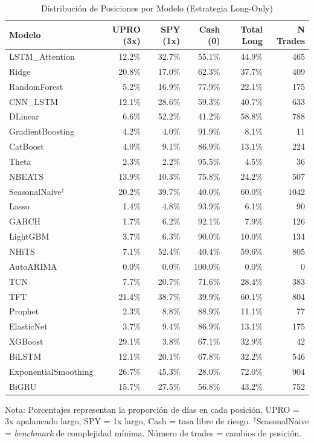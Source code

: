 \begin{table}[H]
\centering
\caption{Distribuci\'on de Posiciones por Modelo (Estrategia Long-Only)}
\label{tab:position_distribution}
\small
\begin{tabular}{@{}lrrrrr@{}}
\toprule
\textbf{Modelo} & \textbf{UPRO (3x)} & \textbf{SPY (1x)} & \textbf{Cash (0)} & \textbf{Total Long} & \textbf{N\textdegree{} Trades} \\
\midrule
LSTM\_Attention & 12.2\% & 32.7\% & 55.1\% & 44.9\% & 465 \\
Ridge & 20.8\% & 17.0\% & 62.3\% & 37.7\% & 409 \\
RandomForest & 5.2\% & 16.9\% & 77.9\% & 22.1\% & 175 \\
CNN\_LSTM & 12.1\% & 28.6\% & 59.3\% & 40.7\% & 633 \\
DLinear & 6.6\% & 52.2\% & 41.2\% & 58.8\% & 788 \\
GradientBoosting & 4.2\% & 4.0\% & 91.9\% & 8.1\% & 11 \\
CatBoost & 4.0\% & 9.1\% & 86.9\% & 13.1\% & 224 \\
Theta & 2.3\% & 2.2\% & 95.5\% & 4.5\% & 36 \\
NBEATS & 13.9\% & 10.3\% & 75.8\% & 24.2\% & 507 \\
\rowcolor{naivebg} SeasonalNaive$^\dagger$ & 20.2\% & 39.7\% & 40.0\% & 60.0\% & 1042 \\
Lasso & 1.4\% & 4.8\% & 93.9\% & 6.1\% & 90 \\
GARCH & 1.7\% & 6.2\% & 92.1\% & 7.9\% & 126 \\
LightGBM & 3.7\% & 6.3\% & 90.0\% & 10.0\% & 134 \\
NHiTS & 7.1\% & 52.4\% & 40.4\% & 59.6\% & 805 \\
AutoARIMA & 0.0\% & 0.0\% & 100.0\% & 0.0\% & 0 \\
TCN & 7.7\% & 20.7\% & 71.6\% & 28.4\% & 383 \\
TFT & 21.4\% & 38.7\% & 39.9\% & 60.1\% & 804 \\
Prophet & 2.3\% & 8.8\% & 88.9\% & 11.1\% & 77 \\
ElasticNet & 3.7\% & 9.4\% & 86.9\% & 13.1\% & 175 \\
XGBoost & 29.1\% & 3.8\% & 67.1\% & 32.9\% & 42 \\
BiLSTM & 12.1\% & 20.1\% & 67.8\% & 32.2\% & 546 \\
ExponentialSmoothing & 26.7\% & 45.3\% & 28.0\% & 72.0\% & 904 \\
BiGRU & 15.7\% & 27.5\% & 56.8\% & 43.2\% & 752 \\
\bottomrule
\end{tabular}
\begin{tablenotes}
\small
\item Nota: Porcentajes representan la proporci\'on de d\'ias en cada posici\'on. UPRO = 3x apalancado largo, SPY = 1x largo, Cash = tasa libre de riesgo. \colorbox{naivebg}{$^\dagger$SeasonalNaive} = \textit{benchmark} de complejidad m\'inima. N\'umero de trades = cambios de posici\'on.
\end{tablenotes}
\end{table}
